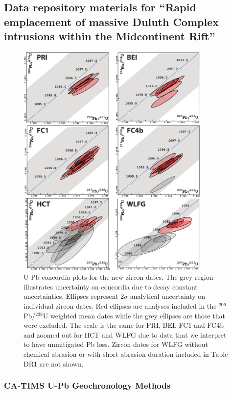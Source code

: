 \documentclass[11pt,letterpaper]{article}
\begin{document}
\subsection*{Data repository materials for ``Rapid emplacement of massive Duluth Complex intrusions within the Midcontinent Rift''}

\renewcommand{\thefigure}{DR\arabic{figure}}
\begin{figure}[!ht]
\noindent\includegraphics[width=0.85\textwidth]{./repository/Concordia_Plots.pdf}
\centering
\caption{\small{U-Pb concordia plots for the new zircon dates. The grey region illustrates uncertainty on concordia due to decay constant uncertainties. Ellipses represent  2$\sigma$ analytical uncertainty on individual zircon dates. Red ellipses are analyses included in the $^{206}$Pb/$^{238}$U weighted mean dates while the grey ellipses are those that were excluded. The scale is the same for PRI, BEI, FC1 and FC4b and zoomed out for HCT and WLFG due to data that we interpret to have unmitigated Pb loss. Zircon dates for WLFG without chemical abrasion or with short abrasion duration included in Table DR1 are not shown.}}
\label{fig:map}
\end{figure}

\subsubsection*{CA-TIMS U-Pb Geochronology Methods}
\end{document}
